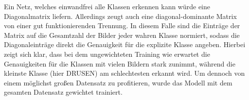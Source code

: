\begin{figure}[h!]
  \hspace{8pt}
  \label{fig:eq_all}
\end{figure}
%
Ein Netz, welches einwandfrei alle Klassen erkennen kann würde eine
Diagonalmatrix liefern. Allerdings zeugt auch eine diagonal-dominante Matrix
von einer gut funktionierenden Trennung. In diesem Falle sind die Einträge der
Matrix auf die Gesamtzahl der Bilder jeder wahren Klasse normiert, sodass die
Diagonaleinträge direkt die Genauigkeit für die explizite Klasse angeben.
Hierbei zeigt sich klar, dass bei dem ungewichteten Training wie erwartet die
Genauigkeiten für die Klassen mit vielen Bildern stark zunimmt, während die
kleinste Klasse (hier DRUSEN) am schlechtesten erkannt wird. Um dennoch von
einem möglichst großen Datensatz zu profitieren, wurde das Modell mit dem
gesamten Datensatz gewichtet trainiert.

